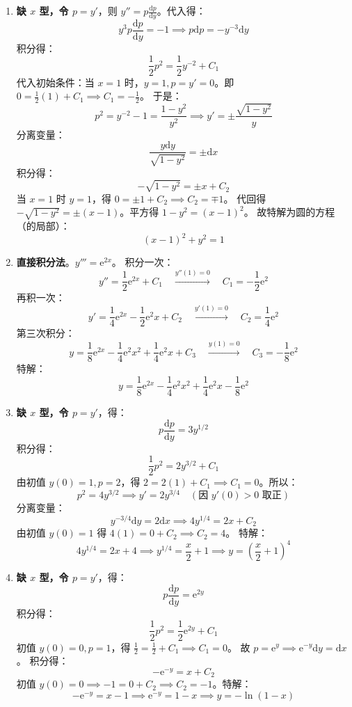 \documentclass[lang=cn,11pt]{elegantbook}
\begin{document}
\begin{solution}
\begin{enumerate}
    \item[(1)] \textbf{缺 $x$ 型，令 $p=y'$}，则 $y''=p\frac{\mathrm{d}p}{\mathrm{d}y}$。代入得：
    \[
    y^3 p \frac{\mathrm{d}p}{\mathrm{d}y} = -1 \implies p\mathrm{d}p = -y^{-3}\mathrm{d}y
    \]
    积分得：
    \[
    \frac{1}{2}p^2 = \frac{1}{2}y^{-2} + C_1
    \]
    代入初始条件：当 $x=1$ 时，$y=1, p=y'=0$。即 $0 = \frac{1}{2}(1) + C_1 \implies C_1 = -\frac{1}{2}$。
    于是：
    \[
    p^2 = y^{-2} - 1 = \frac{1-y^2}{y^2} \implies y' = \pm\frac{\sqrt{1-y^2}}{y}
    \]
    分离变量：
    \[
    \frac{y\mathrm{d}y}{\sqrt{1-y^2}} = \pm\mathrm{d}x
    \]
    积分得：
    \[
    -\sqrt{1-y^2} = \pm x + C_2
    \]
    当 $x=1$ 时 $y=1$，得 $0 = \pm 1 + C_2 \implies C_2 = \mp 1$。
    代回得 $-\sqrt{1-y^2} = \pm(x-1)$。平方得 $1-y^2 = (x-1)^2$。
    故特解为圆的方程（的局部）：
    \[
    \boxed{(x-1)^2 + y^2 = 1}
    \]
    
    \item[(2)] \textbf{直接积分法}。$y''' = \mathrm{e}^{2x}$。
    积分一次：
    \[
    y'' = \frac{1}{2}\mathrm{e}^{2x} + C_1 \quad \xrightarrow{y''(1)=0} \quad C_1=-\frac{1}{2}\mathrm{e}^2
    \]
    再积一次：
    \[
    y' = \frac{1}{4}\mathrm{e}^{2x} - \frac{1}{2}\mathrm{e}^2 x + C_2 \quad \xrightarrow{y'(1)=0} \quad C_2=\frac{1}{4}\mathrm{e}^2
    \]
    第三次积分：
    \[
    y = \frac{1}{8}\mathrm{e}^{2x} - \frac{1}{4}\mathrm{e}^2 x^2 + \frac{1}{4}\mathrm{e}^2 x + C_3 \quad \xrightarrow{y(1)=0} \quad C_3=-\frac{1}{8}\mathrm{e}^2
    \]
    特解：
    \[
    \boxed{y = \frac{1}{8}\mathrm{e}^{2x} - \frac{1}{4}\mathrm{e}^2 x^2 + \frac{1}{4}\mathrm{e}^2 x - \frac{1}{8}\mathrm{e}^2}
    \]
    
    \item[(3)] \textbf{缺 $x$ 型，令 $p=y'$}，得：
    \[
    p\frac{\mathrm{d}p}{\mathrm{d}y} = 3y^{1/2}
    \]
    积分得：
    \[
    \frac{1}{2}p^2 = 2y^{3/2} + C_1
    \]
    由初值 $y(0)=1, p=2$，得 $2 = 2(1) + C_1 \implies C_1=0$。所以：
    \[
    p^2 = 4y^{3/2} \implies y' = 2y^{3/4} \quad (\text{因 } y'(0)>0 \text{ 取正})
    \]
    分离变量：
    \[
    y^{-3/4}\mathrm{d}y = 2\mathrm{d}x \implies 4y^{1/4} = 2x + C_2
    \]
    由初值 $y(0)=1$ 得 $4(1) = 0 + C_2 \implies C_2=4$。
    特解：
    \[
    4y^{1/4} = 2x + 4 \implies y^{1/4} = \frac{x}{2} + 1 \implies \boxed{y = \left(\frac{x}{2} + 1\right)^4}
    \]
    
    \item[(4)] \textbf{缺 $x$ 型，令 $p=y'$}，得：
    \[
    p\frac{\mathrm{d}p}{\mathrm{d}y} = \mathrm{e}^{2y}
    \]
    积分得：
    \[
    \frac{1}{2}p^2 = \frac{1}{2}\mathrm{e}^{2y} + C_1
    \]
    初值 $y(0)=0, p=1$，得 $\frac{1}{2} = \frac{1}{2} + C_1 \implies C_1=0$。
    故 $p = \mathrm{e}^y \implies \mathrm{e}^{-y}\mathrm{d}y = \mathrm{d}x$。
    积分得：
    \[
    -\mathrm{e}^{-y} = x + C_2
    \]
    初值 $y(0)=0 \implies -1 = 0 + C_2 \implies C_2=-1$。特解：
    \[
    -\mathrm{e}^{-y} = x - 1 \implies \mathrm{e}^{-y} = 1-x \implies \boxed{y = -\ln(1-x)}
    \]
    

\end{enumerate}
\end{solution}
\end{document}
